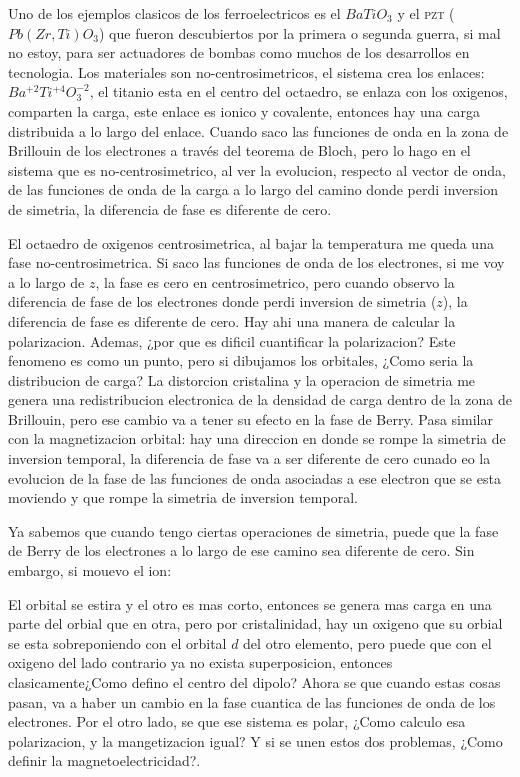 \documentclass[11pt,fleqn]{book}
\begin{document}
Uno de los ejemplos clasicos de los ferroelectricos es el $BaTiO_{3}$ y el \textsc{pzt} ($Pb(Zr,Ti)O_{3}$) que fueron descubiertos por la primera o segunda guerra, si mal no estoy, para ser actuadores de bombas como muchos de los desarrollos en tecnologia. Los materiales son no-centrosimetricos, el sistema crea los enlaces: $Ba^{+2}Ti^{+4}O_{3}^{-2}$, el titanio esta en el centro del octaedro, se enlaza con los oxigenos, comparten la carga, este enlace es ionico y covalente, entonces hay una carga distribuida a lo largo del enlace. Cuando saco las funciones de onda en la zona de Brillouin de los electrones a través del teorema de Bloch, pero lo hago en el sistema que es no-centrosimetrico, al ver la evolucion, respecto al vector de onda, de las funciones de onda de la carga a lo largo del camino donde perdi inversion de simetria, la diferencia de fase es diferente de cero.


El octaedro de oxigenos centrosimetrica, al bajar la temperatura me queda una fase no-centrosimetrica. Si saco las funciones de onda de los electrones, si me voy a lo largo de $z$, la fase es cero en centrosimetrico, pero cuando observo la diferencia de fase de los electrones donde perdi inversion de simetria ($z$), la diferencia de fase es diferente de cero. Hay ahi una manera de calcular la polarizacion. Ademas, ¿por que es dificil cuantificar la polarizacion? Este fenomeno es como un punto, pero si dibujamos los orbitales, ¿Como seria la distribucion de carga? La distorcion cristalina y la operacion de simetria me genera una redistribucion electronica de la densidad de carga dentro de la zona de Brillouin, pero ese cambio va a tener su efecto en la fase de Berry. Pasa similar con la  magnetizacion orbital: hay una direccion en donde se rompe la simetria de inversion temporal, la diferencia de fase va a ser diferente de cero cunado eo la evolucion de la fase de las funciones de onda asociadas a ese electron que se esta moviendo y que rompe la simetria de inversion temporal.

Ya sabemos que cuando tengo ciertas operaciones de simetria, puede que la fase de Berry de los electrones a lo largo de ese camino sea diferente de cero. Sin embargo, si mouevo el ion:


El orbital se estira y el otro es mas corto, entonces se genera mas carga en una parte del orbial que en otra, pero por cristalinidad, hay un oxigeno que su orbial se esta sobreponiendo con el orbital $d$ del otro elemento, pero puede que con el oxigeno del lado contrario ya no exista superposicion, entonces clasicamente¿Como defino el centro del dipolo? Ahora se que cuando estas cosas pasan, va a haber un cambio en la fase cuantica de las funciones de onda de los electrones. Por el otro lado, se que ese sistema es polar, ¿Como calculo esa polarizacion, y la mangetizacion igual? Y si se unen estos dos problemas, ¿Como definir la magnetoelectricidad?. 
\end{document}
